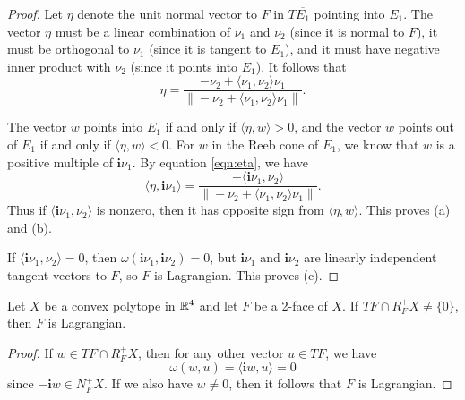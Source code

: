\begin{proof}
Let $\eta$ denote the unit normal vector to $F$ in $T\overline{E_1}$ pointing into $E_1$. The vector $\eta$ must be a linear combination of $\nu_1$ and $\nu_2$ (since it is normal to $F$), it must be orthogonal to $\nu_1$ (since it is tangent to $E_1$), and it must have negative inner product with $\nu_2$ (since it points into $E_1$). It follows that
\begin{equation}
\label{eqn:eta}
\eta = \frac{-\nu_2 + \langle\nu_1,\nu_2\rangle\nu_1}{\|-\nu_2 + \langle\nu_1,\nu_2\rangle\nu_1\|}.
\end{equation}

The vector $w$ points into $E_1$ if and only if $\langle \eta,w\rangle >0$, and the vector $w$ points out of $E_1$ if and only if $\langle \eta,w\rangle < 0$. For $w$ in the Reeb cone of $E_1$, we know that $w$ is a positive multiple of ${\mathbf i}\nu_1$. By equation \eqref{eqn:eta}, we have
\[
\langle \eta,{\mathbf i}\nu_1\rangle = \frac{-\langle{\mathbf i}\nu_1,\nu_2\rangle}{\|-\nu_2 + \langle\nu_1,\nu_2\rangle\nu_1\|}.
\]
Thus if $\langle {\mathbf i}\nu_1,\nu_2\rangle$ is nonzero, then it has opposite sign from $\langle \eta,w\rangle$. This proves (a) and (b).

If $\langle {\mathbf i}\nu_1,\nu_2\rangle = 0$, then $\omega({\mathbf i}\nu_1,{\mathbf i}\nu_2) = 0$, but ${\mathbf i}\nu_1$ and ${\mathbf i}\nu_2$ are linearly independent tangent vectors to $F$, so $F$ is Lagrangian. This proves (c).
\end{proof}

\begin{lemma}
\label{lem:la}
Let $X$ be a convex polytope in ${\mathbb R}^4$ and let $F$ be a 2-face of $X$. If $TF\cap R_F^+X\neq\{0\}$, then $F$ is Lagrangian.
\end{lemma}

\begin{proof}
If $w\in TF\cap R_F^+X$, then for any other vector $u\in TF$, we have
\[
\omega(w,u) = \langle {\mathbf i}w,u\rangle = 0
\]
since $-{\mathbf i}w\in N_F^+X$. If we also have $w\neq 0$, then it follows that $F$ is Lagrangian.
\end{proof}

